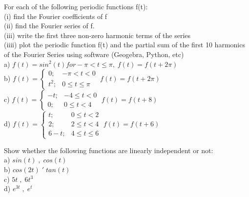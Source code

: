 \documentclass[12pt,letterpaper, onecolumn]{exam}
\begin{document}
\begin{questions}
    \question[16 Marks] For each of the following periodic functions f(t):\\
             (i) find the Fourier coefficients of f\\
             (ii) find the Fourier series of f.\\
             (iii) write the first three non-zero harmonic terms of the series\\
             (iiii) plot the periodic function f(t) and the partial sum of the first 10 harmonics of the Fourier Series using software (Geogebra, Python, etc)\\
             a) $f(t) = sin^2(t) for -\pi < t \le \pi, \; f(t) = f(t + 2\pi)$\\
             b) $f(t) = \begin{cases}
                   0; & -\pi < t < 0\\
                   t^2; & 0 \le t \le \pi \end{cases} \; f(t) = f(t + 2\pi)$ \\
             c) $f(t) = \begin{cases}
                   -t; & -4 \le t < 0\\
                   0; & 0 \le t < 4 \end{cases} \; f(t) = f(t + 8)$ \\
             d) $f(t) = \begin{cases}
                   t; & 0 \le t < 2\\
                   2; & 2 \le t < 4\\
                   6-t; & 4 \le t \le 6 \end{cases} \; f(t) = f(t + 6)$
    \droppoints

    \question[4 Marks] Show whether the following functions are linearly independent or not:\\
             a) $sin(t) \; , \; cos(t)$\\
             b) $cos(2t) \; ' \; tan(t)$\\
             c) $5t \; , \; 6t^3$\\
             d) $e^{3t} \; , \; e^t$
    \droppoints
    
    
\end{questions}
\end{document}
